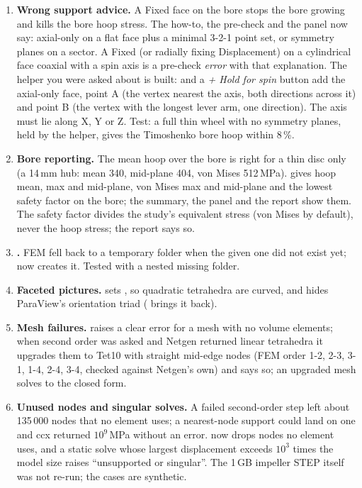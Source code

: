 \begin{enumerate}[nosep]
  \item \textbf{Wrong support advice.} A Fixed face on the bore stops the bore growing and kills the bore hoop stress. The
        how-to, the pre-check and the panel now say: axial-only on a flat face plus a minimal 3-2-1 point set, or symmetry
        planes on a sector. A Fixed (or radially fixing Displacement) on a cylindrical face coaxial with a spin axis is a
        pre-check \emph{error} with that explanation. The helper you were asked about is built:
         and a \emph{+ Hold for spin} button add the axial-only face, point A
        (the vertex nearest the axis, both directions across it) and point B (the vertex with the longest lever arm, one
        direction). The axis must lie along X, Y or Z. Test: a full thin wheel with no symmetry planes, held by the helper,
        gives the Timoshenko bore hoop within 8\,\%.
  \item \textbf{Bore reporting.} The mean hoop over the bore is right for a thin disc only (a 14\,mm hub: mean 340, mid-plane
        404, von Mises 512\,MPa).  gives hoop mean, max and mid-plane, von Mises
        max and mid-plane and the lowest safety factor on the bore; the summary, the panel and the report show them. The
        safety factor divides the study's equivalent stress (von Mises by default), never the hoop stress; the report says so.
  \item \textbf{.} FEM fell back to a temporary folder when the given one did not exist yet;
         now creates it. Tested with a nested missing folder.
  \item \textbf{Faceted pictures.}  sets , so quadratic tetrahedra are
        curved, and hides ParaView's orientation triad ( brings it back).
  \item \textbf{Mesh failures.}  raises a clear error for a mesh with no volume elements; when second order
        was asked and Netgen returned linear tetrahedra it upgrades them to Tet10 with straight mid-edge nodes (FEM order
        1-2, 2-3, 3-1, 1-4, 2-4, 3-4, checked against Netgen's own) and says so; an upgraded mesh solves to the closed form.
  \item \textbf{Unused nodes and singular solves.} A failed second-order step left about 135\,000 nodes that no element uses;
        a nearest-node support could land on one and ccx returned $10^9$\,MPa without an error.  now drops
        nodes no element uses, and a static solve whose largest displacement exceeds $10^3$ times the model size raises
        ``unsupported or singular''. The 1\,GB impeller STEP itself was not re-run; the cases are synthetic.
\end{enumerate}

